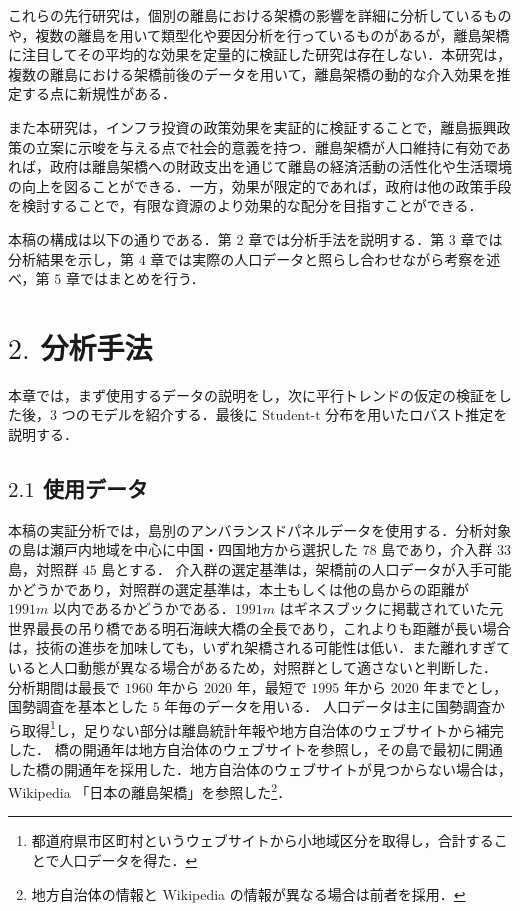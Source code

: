 これらの先行研究は，個別の離島における架橋の影響を詳細に分析しているものや，複数の離島を用いて類型化や要因分析を行っているものがあるが，離島架橋に注目してその平均的な効果を定量的に検証した研究は存在しない．本研究は，複数の離島における架橋前後のデータを用いて，離島架橋の動的な介入効果を推定する点に新規性がある．

また本研究は，インフラ投資の政策効果を実証的に検証することで，離島振興政策の立案に示唆を与える点で社会的意義を持つ．離島架橋が人口維持に有効であれば，政府は離島架橋への財政支出を通じて離島の経済活動の活性化や生活環境の向上を図ることができる．一方，効果が限定的であれば，政府は他の政策手段を検討することで，有限な資源のより効果的な配分を目指すことができる．

本稿の構成は以下の通りである．第 \(2\) 章では分析手法を説明する．第
\(3\) 章では分析結果を示し，第 \(4\)
章では実際の人口データと照らし合わせながら考察を述べ，第 \(5\)
章ではまとめを行う．

\hypertarget{ux5206ux6790ux624bux6cd5}{%
\section{\texorpdfstring{\(2.\)
分析手法}{2. 分析手法}}\label{ux5206ux6790ux624bux6cd5}}

本章では，まず使用するデータの説明をし，次に平行トレンドの仮定の検証をした後，\(3\)
つのモデルを紹介する．最後に \(\text{Student-t}\)
分布を用いたロバスト推定を説明する．

\hypertarget{ux4f7fux7528ux30c7ux30fcux30bf}{%
\subsection{\texorpdfstring{\(2.1\)
使用データ}{2.1 使用データ}}\label{ux4f7fux7528ux30c7ux30fcux30bf}}

本稿の実証分析では，島別のアンバランスドパネルデータを使用する．分析対象の島は瀬戸内地域を中心に中国・四国地方から選択した
\(78\) 島であり，介入群 \(33\) 島，対照群 \(45\) 島とする．
介入群の選定基準は，架橋前の人口データが入手可能かどうかであり，対照群の選定基準は，本土もしくは他の島からの距離が
\(1991m\) 以内であるかどうかである．\(1991m\)
はギネスブックに掲載されていた元世界最長の吊り橋である明石海峡大橋の全長であり，これよりも距離が長い場合は，技術の進歩を加味しても，いずれ架橋される可能性は低い．また離れすぎていると人口動態が異なる場合があるため，対照群として適さないと判断した．
分析期間は最長で \(1960\) 年から \(2020\) 年，最短で \(1995\) 年から
\(2020\) 年までとし，国勢調査を基本とした \(5\) 年毎のデータを用いる．
人口データは主に国勢調査から取得\footnote{都道府県市区町村というウェブサイトから小地域区分を取得し，合計することで人口データを得た．}し，足りない部分は離島統計年報や地方自治体のウェブサイトから補完した．
橋の開通年は地方自治体のウェブサイトを参照し，その島で最初に開通した橋の開通年を採用した．地方自治体のウェブサイトが見つからない場合は，Wikipedia
「日本の離島架橋」を参照した\footnote{地方自治体の情報と Wikipedia
  の情報が異なる場合は前者を採用．}．

